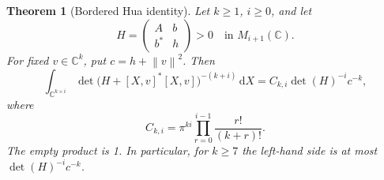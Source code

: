 \documentclass[11pt,letterpaper]{article}
\newtheorem{theorem}{Theorem}[section]
\theoremstyle{remark}
\newcommand{\C}{\mathbb C}
\newcommand{\dd}{\,\mathrm d}
\newcommand{\norm}[1]{\left\lVert#1\right\rVert}
\begin{document}
\begin{theorem}[Bordered Hua identity]\label{thm:border}
Let $k\geq1$, $i\geq0$, and let
\[
 H=\begin{pmatrix}A&b\\b^*&h\end{pmatrix}>0
 \quad\text{in }M_{i+1}(\C).
\]
For fixed $v\in\C^k$, put $c=h+\norm v^2$. Then
\begin{equation}\label{eq:border}
 \int_{\C^{k\times i}}
 \det\bigl(H+[X,v]^*[X,v]\bigr)^{-(k+i)}\dd X
 =C_{k,i}\det(H)^{-i}c^{-k},
\end{equation}
where
\begin{equation}\label{eq:constant}
 C_{k,i}=\pi^{ki}\prod_{r=0}^{i-1}\frac{r!}{(k+r)!}.
\end{equation}
The empty product is 1. In particular, for $k\geq7$ the left-hand side is at most
$\det(H)^{-i}c^{-k}$.
\end{theorem}
\end{document}
